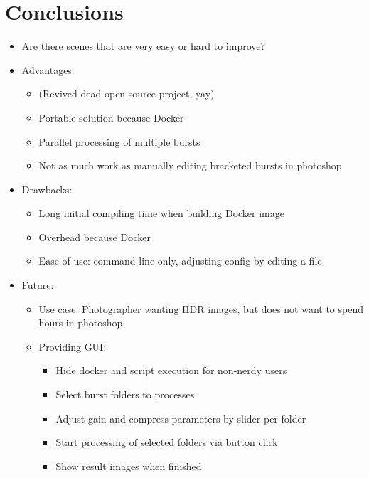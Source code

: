 \documentclass{egpubl}
\begin{document}
\section{Conclusions}

\begin{itemize}
      \item Are there scenes that are very easy or hard to improve?
      \item Advantages:
      \begin{itemize}
            \item (Revived dead open source project, yay)
            \item Portable solution because Docker
            \item Parallel processing of multiple bursts
            \item Not as much work as manually editing bracketed bursts in photoshop
      \end{itemize}
      \item Drawbacks:
      \begin{itemize}
            \item Long initial compiling time when building Docker image
            \item Overhead because Docker
            \item Ease of use: command-line only, adjusting config by editing a file
      \end{itemize}
      \item Future:
      \begin{itemize}
            \item Use case: Photographer wanting HDR images, but does not want to spend
                  hours in photoshop
            \item Providing GUI:
            \begin{itemize}
                  \item Hide docker and script execution for non-nerdy users
                  \item Select burst folders to processes
                  \item Adjust gain and compress parameters by slider per folder
                  \item Start processing of selected folders via button click
                  \item Show result images when finished
            \end{itemize}
      \end{itemize}
\end{itemize}
\label{sec:conclusion}
\end{document}
